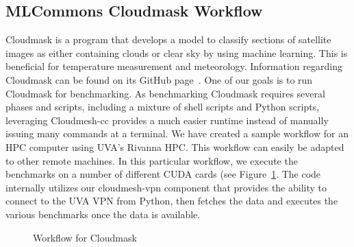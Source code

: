 
\subsection{MLCommons Cloudmask Workflow}
\label{cloudmask-workflow}

Cloudmask is a program that develops a model to classify sections of
satellite images as either containing clouds or clear sky by using
machine learning. This is beneficial for temperature measurement and
meteorology.  Information regarding Cloudmask can be found on its
GitHub page~\cite{www-cloudmask}.
One of our goals is to run Cloudmask for benchmarking.
As benchmarking Cloudmask requires
several phases and scripts, including a mixture of shell scripts and
Python scripts, leveraging Cloudmesh-cc provides a much easier runtime
instead of manually issuing many commands at a terminal.
We have created a sample workflow for an HPC
computer using UVA's Rivanna HPC. 
This workflow can easily be adapted to other remote machines. In this
particular workflow, we execute the benchmarks on a number of different
CUDA cards (see Figure~\ref{fig:cloudmaskwf}. The code internally utilizes
our cloudmesh-vpn component that provides the ability to
connect to the UVA VPN from Python, then fetches the data and executes
the various benchmarks once the data is available.


\begin{figure}[htb]
  \vspace{-1cm}
  \caption{Workflow for Cloudmask}\label{fig:cloudmaskwf}
\end{figure}

